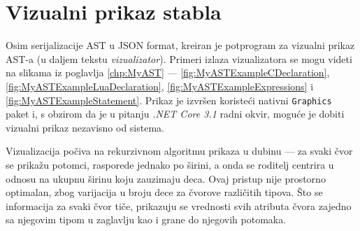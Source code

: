 \section{Vizualni prikaz stabla}
\label{sec:ImplementationVisualizer}

Osim serijalizacije AST u JSON format, kreiran je potprogram za vizualni prikaz AST-a (u daljem tekstu \emph{vizualizator}). Primeri izlaza vizualizatora se mogu videti na slikama iz poglavlja \ref{chp:MyAST} --- \ref{fig:MyASTExampleCDeclaration}, \ref{fig:MyASTExampleLuaDeclaration}, \ref{fig:MyASTExampleExpressions} i \ref{fig:MyASTExampleStatement}. Prikaz je izvršen koristeći nativni \texttt{Graphics} paket i, s obzirom da je u pitanju \emph{.NET Core 3.1} radni okvir, moguće je dobiti vizualni prikaz nezavisno od sistema.

Vizualizacija počiva na rekurzivnom algoritmu prikaza u dubinu --- za svaki čvor se prikažu potomci, rasporede jednako po širini, a onda se roditelj centrira u odnosu na ukupnu širinu koju zauzimaju deca. Ovaj pristup nije prostorno optimalan, zbog varijacija u broju dece za čvorove različitih tipova. Što se informacija za svaki čvor tiče, prikazuju se vrednosti svih atributa čvora zajedno sa njegovim tipom u zaglavlju kao i grane do njegovih potomaka.
